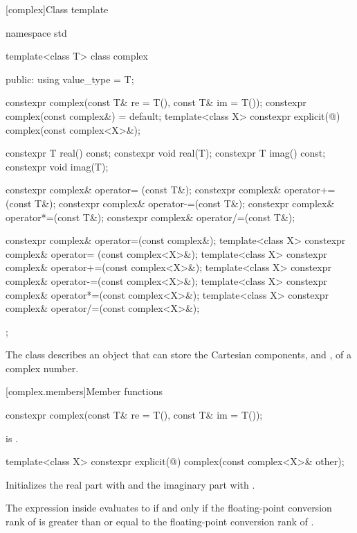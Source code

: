 [complex]{Class template }

%
%
\begin{codeblock}
namespace std {
  template<class T> class complex {
  public:
    using value_type = T;

    constexpr complex(const T& re = T(), const T& im = T());
    constexpr complex(const complex&) = default;
    template<class X> constexpr explicit(@\seebelow@) complex(const complex<X>&);

    constexpr T real() const;
    constexpr void real(T);
    constexpr T imag() const;
    constexpr void imag(T);

    constexpr complex& operator= (const T&);
    constexpr complex& operator+=(const T&);
    constexpr complex& operator-=(const T&);
    constexpr complex& operator*=(const T&);
    constexpr complex& operator/=(const T&);

    constexpr complex& operator=(const complex&);
    template<class X> constexpr complex& operator= (const complex<X>&);
    template<class X> constexpr complex& operator+=(const complex<X>&);
    template<class X> constexpr complex& operator-=(const complex<X>&);
    template<class X> constexpr complex& operator*=(const complex<X>&);
    template<class X> constexpr complex& operator/=(const complex<X>&);
  };
}
\end{codeblock}

\pnum
The class
describes an object that can
store the Cartesian components,
and
,
of a complex
number.

[complex.members]{Member functions}

%
\begin{itemdecl}
constexpr complex(const T& re = T(), const T& im = T());
\end{itemdecl}

\begin{itemdescr}
\pnum
\ensures
{} is .
\end{itemdescr}

%
\begin{itemdecl}
template<class X> constexpr explicit(@\seebelow@) complex(const complex<X>& other);
\end{itemdecl}

\begin{itemdescr}
\pnum
\effects
Initializes the real part with  and
the imaginary part with .

\pnum
\remarks
The expression inside  evaluates to 
if and only if the floating-point conversion rank of 
is greater than or equal to the floating-point conversion rank of .
\end{itemdescr}

